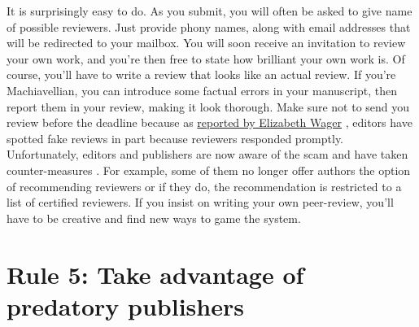 \documentclass[a4paper,10pt,onecolumn]{article}
\begin{document}
It is surprisingly easy to do. As you submit, you will often be asked to give name of possible reviewers. Just
provide phony names, along with email addresses that will be redirected to
your mailbox. You will soon receive an invitation to review your own work, and you're then
free to state how brilliant your own work is. Of
course, you'll have to write a review that looks like an actual review. If
you're Machiavellian, you can introduce some factual errors in your
manuscript, then report them in your review, making it look thorough. Make sure not to send you review before the deadline because as
\href{https://arstechnica.com/science/2017/04/107-cancer-papers-retracted-due-to-peer-review-fraud/}{reported
  by Elizabeth Wager} \citep{stigbrand:2017}, editors have
spotted fake reviews in part because reviewers responded promptly. Unfortunately, editors and
publishers are now aware of the scam \citep{ferguson:2014} and  have
taken counter-measures \citep{haug:2015}. For example, some of them no longer offer authors the option of recommending reviewers or if they do, the
recommendation is restricted to a list of certified reviewers. If you insist on
writing your own peer-review, you'll have to be creative and find new ways to
game the system.



\section*{Rule 5: Take advantage of predatory publishers}
\end{document}
